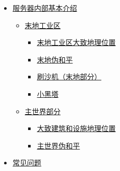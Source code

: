 \documentclass[
]{article}
\providecommand{\tightlist}{%
  \setlength{\itemsep}{0pt}\setlength{\parskip}{0pt}}
\begin{document}
\begin{itemize}
  \begin{itemize}
  \item
    \hyperref[java]{Java的安装}

    \begin{itemize}
    \tightlist
    \item
      \hyperref[java-1]{如何选择Java版本}
    \item
      \hyperref[launcherx]{对于LauncherX启动器}
    \end{itemize}
  \item
    \hyperref[section-16]{我服基本信息}

    \begin{itemize}
    \tightlist
    \item
      \hyperref[section-17]{版本等基本信息}
    \item
      \hyperref[section-18]{连接方式}
    \end{itemize}
  \item
    \hyperref[section-19]{启动器选择和整合包的安装}

    \begin{itemize}
    \tightlist
    \item
      \hyperref[section-20]{不建议使用的启动器}
    \item
      \hyperref[section-21]{整合包在哪里？}
    \item
      \hyperref[hmcl]{HMCL}
    \item
      \hyperref[pcl2]{PCL2}
    \end{itemize}
  \end{itemize}
\item
  \hyperref[section-22]{服务器内部基本介绍}

  \begin{itemize}
  \item
    \hyperref[section-23]{末地工业区}

    \begin{itemize}
    \tightlist
    \item
      \hyperref[section-24]{末地工业区大致地理位置}
    \item
      \hyperref[section-25]{末地伪和平}
    \item
      \hyperref[section-26]{刷沙机（末地部分）}
    \item
      \hyperref[section-27]{小黑塔}
    \end{itemize}
  \item
    \hyperref[section-28]{主世界部分}

    \begin{itemize}
    \tightlist
    \item
      \hyperref[section-29]{大致建筑和设施地理位置}
    \item
      \hyperref[section-30]{主世界伪和平}
    \end{itemize}
  \end{itemize}
\item
  \hyperref[section-31]{常见问题}


\end{itemize}
\end{document}
